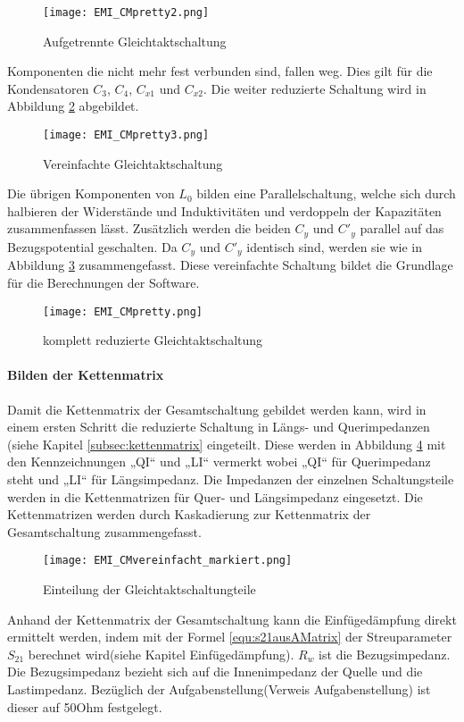 \begin{figure}[H]
	\centering
	\texttt{[image: EMI\_CMpretty2.png]}
	\caption{Aufgetrennte Gleichtaktschaltung}
	\label{fig:CMSchaltungaufgetrennt}
\end{figure}
Komponenten die nicht mehr fest verbunden sind, fallen weg. Dies gilt für die Kondensatoren $C_3$, $C_4$, $C_{x1}$ und $C_{x2}$. Die weiter reduzierte Schaltung wird in Abbildung \ref{fig:CMSchaltungvereinfacht1} abgebildet.
\begin{figure}[H]
	\centering
	\texttt{[image: EMI\_CMpretty3.png]}
	\caption{Vereinfachte Gleichtaktschaltung}
	\label{fig:CMSchaltungvereinfacht1}
\end{figure}
Die übrigen Komponenten von $L_0$ bilden eine Parallelschaltung, welche sich durch halbieren der Widerstände und Induktivitäten und verdoppeln der Kapazitäten zusammenfassen lässt. Zusätzlich werden die beiden $C_y$ und $C'_{y}$ parallel auf das Bezugspotential geschalten. Da $C_y$ und $C'_y$ identisch sind, werden sie wie in Abbildung \ref{fig:CMSchaltungvereinfacht} zusammengefasst. Diese vereinfachte Schaltung bildet die Grundlage für die Berechnungen der Software.

\begin{figure}[H]
	\centering
	\texttt{[image: EMI\_CMpretty.png]}
	\caption{komplett reduzierte Gleichtaktschaltung}
	\label{fig:CMSchaltungvereinfacht}
\end{figure}

\paragraph{Bilden der Kettenmatrix}\label{para:kettenGleichtakt}
Damit die Kettenmatrix der Gesamtschaltung gebildet werden kann, wird in einem ersten Schritt die reduzierte Schaltung in Längs- und Querimpedanzen (siehe Kapitel \ref{subsec:kettenmatrix} eingeteilt. Diese werden in Abbildung \ref{fig:cmschaltung} mit den Kennzeichnungen „QI“ und „LI“ vermerkt wobei „QI“ für Querimpedanz steht und „LI“ für Längsimpedanz. Die Impedanzen der einzelnen Schaltungsteile werden in die Kettenmatrizen für Quer- und Längsimpedanz eingesetzt. Die Kettenmatrizen werden durch Kaskadierung zur Kettenmatrix der Gesamtschaltung zusammengefasst.
\begin{figure}[H]
		\centering
		\texttt{[image: EMI\_CMvereinfacht\_markiert.png]}
		\label{fig:cmschaltung}
		\caption{Einteilung der Gleichtaktschaltungteile}
\end{figure}
Anhand der Kettenmatrix der Gesamtschaltung kann die Einfügedämpfung direkt ermittelt werden, indem mit der Formel \ref{equ:s21ausAMatrix} der Streuparameter $S_{21}$ berechnet wird(siehe Kapitel Einfügedämpfung). $R_w$ ist die Bezugsimpedanz. Die Bezugsimpedanz bezieht sich auf die Innenimpedanz der Quelle und die Lastimpedanz. Bezüglich der Aufgabenstellung(Verweis Aufgabenstellung) ist dieser auf 50Ohm festgelegt.

